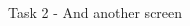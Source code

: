 \begin{frame}{Task 2 - And another screen}
    \begin{columns}
        \begin{column}{0.5\textwidth}
            \begin{figure}[h]
                {
                    \setlength{\fboxsep}{0pt}%
                    \setlength{\fboxrule}{0.5pt}%
                }
            \end{figure}
        \end{column}
        \begin{column}{0.5\textwidth}
            \begin{figure}[h]
                {
                    \setlength{\fboxsep}{0pt}%
                    \setlength{\fboxrule}{0.5pt}%
}
\end{figure}
\end{column}
\end{columns}
\end{frame}
